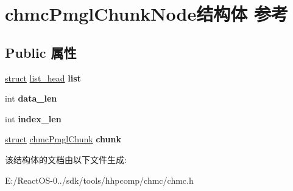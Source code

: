 \hypertarget{structchmc_pmgl_chunk_node}{}\section{chmc\+Pmgl\+Chunk\+Node结构体 参考}
\label{structchmc_pmgl_chunk_node}
\subsection*{Public 属性}
\begin{DoxyCompactItemize}
\item 
\mbox{\label{structchmc_pmgl_chunk_node_a7191dcae4b13148a11cd54a53709660c}} 
\hyperlink{interfacestruct}{struct} \hyperlink{structlist__head}{list\+\_\+head} {\bfseries list}
\item 
\mbox{\label{structchmc_pmgl_chunk_node_a83e75f9130ed6f760631b49fbf9c5364}} 
int {\bfseries data\+\_\+len}
\item 
\mbox{\label{structchmc_pmgl_chunk_node_a7269212a697a6b461df5e17673dcc0b7}} 
int {\bfseries index\+\_\+len}
\item 
\mbox{\label{structchmc_pmgl_chunk_node_a2394cac965caedbfff8e84b63355018a}} 
\hyperlink{interfacestruct}{struct} \hyperlink{structchmc_pmgl_chunk}{chmc\+Pmgl\+Chunk} {\bfseries chunk}
\end{DoxyCompactItemize}


该结构体的文档由以下文件生成\+:\begin{DoxyCompactItemize}
\item 
E\+:/\+React\+O\+S-\/0../sdk/tools/hhpcomp/chmc/chmc.\+h\end{DoxyCompactItemize}

